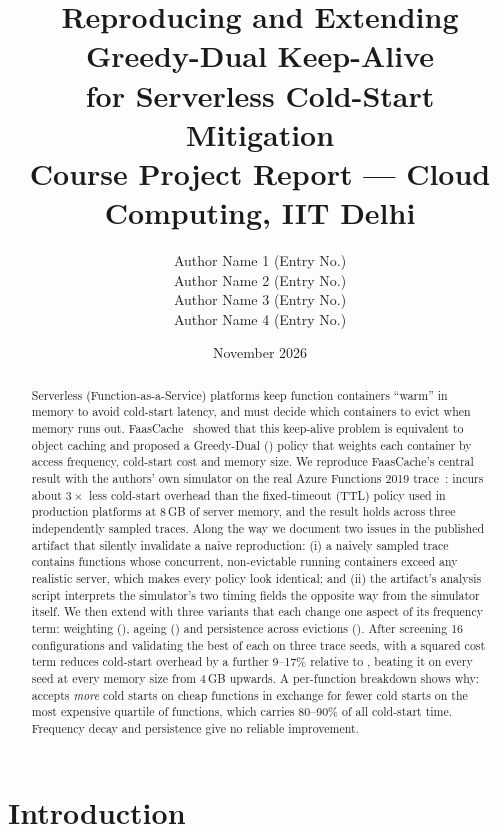 \documentclass[11pt,a4paper]{article}
\title{\textbf{Reproducing and Extending Greedy-Dual Keep-Alive\\for Serverless Cold-Start Mitigation}\\[4pt]
\large Course Project Report --- Cloud Computing, IIT Delhi}
\author{
  Author Name 1 \quad (Entry No.) \\
  Author Name 2 \quad (Entry No.) \\
  Author Name 3 \quad (Entry No.) \\
  Author Name 4 \quad (Entry No.)
}
\date{November 2026}
\newcommand{\gd}{\text{GD}}
\newcommand{\gdw}{\text{GD-W}}
\newcommand{\gdd}{\text{GD-D}}
\newcommand{\gdh}{\text{GD-H}}
\begin{document}
\maketitle

\begin{abstract}
Serverless (Function-as-a-Service) platforms keep function containers ``warm'' in memory
to avoid cold-start latency, and must decide which containers to evict when memory runs out.
FaasCache~\cite{fuerst2021faascache} showed that this keep-alive problem is equivalent to
object caching and proposed a Greedy-Dual (\gd{}) policy that weights each container by
access frequency, cold-start cost and memory size. We reproduce FaasCache's central result
with the authors' own simulator on the real Azure Functions 2019 trace~\cite{shahrad2020serverless}:
\gd{} incurs about $3\times$ less cold-start overhead than the fixed-timeout (TTL) policy
used in production platforms at 8\,GB of server memory, and the result holds across three
independently sampled traces. Along the way we document two issues in the published artifact
that silently invalidate a naive reproduction: (i) a naively sampled trace contains functions
whose concurrent, non-evictable running containers exceed any realistic server, which makes
every policy look identical; and (ii) the artifact's analysis script interprets the
simulator's two timing fields the opposite way from the simulator itself. We then extend \gd{}
with three variants that each change one aspect of its frequency term: weighting (\gdw{}),
ageing (\gdd{}) and persistence across evictions (\gdh{}). After screening 16
configurations and validating the best of each on three trace seeds, \gdw{} with a squared
cost term reduces cold-start overhead by a further 9--17\% relative to \gd{}, beating it on
every seed at every memory size from 4\,GB upwards. A per-function breakdown shows why: \gdw{}
accepts \emph{more} cold starts on cheap functions in exchange for fewer cold starts on the
most expensive quartile of functions, which carries 80--90\% of all cold-start time.
Frequency decay and persistence give no reliable improvement.
\end{abstract}

\tableofcontents
\newpage

\section{Introduction}
\label{sec:intro}
\end{document}
